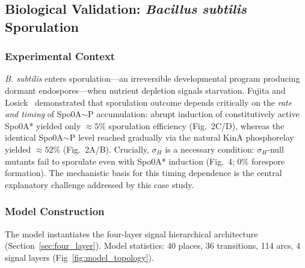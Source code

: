\documentclass[10pt,letterpaper]{article}
\begin{document}
\subsection{Biological Validation: \textit{Bacillus subtilis} Sporulation}

\subsubsection{Experimental Context}

\textit{B. subtilis} enters sporulation---an irreversible developmental program producing dormant endospores---when nutrient depletion signals starvation. Fujita and Losick~\cite{fujita2005} demonstrated that sporulation outcome depends critically on the \emph{rate and timing} of Spo0A$\sim$P accumulation: abrupt induction of constitutively active Spo0A* yielded only $\approx 5\%$ sporulation efficiency (Fig.~2C/D), whereas the identical Spo0A$\sim$P level reached gradually via the natural KinA phosphorelay yielded $\approx 52\%$ (Fig.~2A/B). Crucially, $\sigma_H$ is a necessary condition: $\sigma_H$-null mutants fail to sporulate even with Spo0A* induction (Fig.~4; 0\% forespore formation). The mechanistic basis for this timing dependence is the central explanatory challenge addressed by this case study.

\subsubsection{Model Construction}

The model instantiates the four-layer signal hierarchical architecture (Section~\ref{sec:four_layer}). Model statistics: 40 places, 36 transitions, 114 arcs, 4 signal layers (Fig~\ref{fig:model_topology}).
\end{document}
